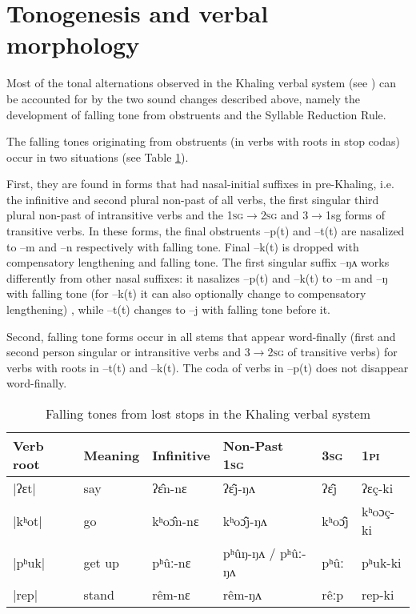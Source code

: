 \documentclass[oldfontcommands,oneside,a4paper,11pt]{article}
\newcommand{\ipa}[1]{{\phon \mbox{#1}}} %
\begin{document}
\section{Tonogenesis and verbal morphology} \label{sec:tonogenesis.verb}
Most of the tonal alternations observed in the Khaling verbal system (see \citealt{jacques12khaling}) can be accounted for by the two sound changes described above, namely the development of falling tone from obstruents and the Syllable Reduction Rule.

 The falling tones originating from obstruents (in verbs with roots in stop codas) occur in two situations (see Table \ref{tab:falling.verb}).
 
 First, they are found  in forms that had nasal-initial suffixes in pre-Khaling, i.e. the infinitive and second plural non-past of all verbs, the first singular third plural non-past of intransitive verbs  and the   \textsc{1sg$\rightarrow$2sg} and {3$\rightarrow$1sg} forms of transitive verbs. In these forms, the final obstruents \ipa{--p(t)} and  \ipa{--t(t)} are nasalized to \ipa{--m} and \ipa{--n} respectively with falling tone. Final \ipa{--k(t)} is dropped with compensatory lengthening and falling tone. The first singular suffix \ipa{--ŋʌ} works differently from other nasal suffixes:  it nasalizes \ipa{--p(t)} and   \ipa{--k(t)} to \ipa{--m} and \ipa{--ŋ} with falling tone (for  \ipa{--k(t)}  it can also optionally change to compensatory lengthening) , while \ipa{--t(t)} changes to \ipa{--j} with falling tone before it.
 
 Second, falling tone forms occur in all stems that appear word-finally (first and second person singular or intransitive verbs and \textsc{3$\rightarrow$2sg} of transitive verbs) for verbs with roots in \ipa{--t(t)} and   \ipa{--k(t)}. The coda of verbs in \ipa{--p(t)} does not disappear word-finally.

\begin{table}[H]
\caption{Falling tones from lost stops in the Khaling verbal system} \centering \label{tab:falling.verb}
\begin{tabular}{llllll}
\toprule
Verb root	&Meaning	&Infinitive  & Non-Past \textsc{1sg} &  \textsc{3sg} &  \textsc{1pi}\\
\midrule
|ʔɛt|	&	say			&\ipa{ʔɛ̂n-nɛ}		&\ipa{ʔɛ̂j-ŋʌ}	&\ipa{ʔɛ̂j} &\ipa{ʔɛç-ki} \\
|kʰot|	&	go		&\ipa{kʰoɔ̂n-nɛ}		&\ipa{kʰoɔ̂j-ŋʌ}&\ipa{kʰoɔ̂j} &\ipa{kʰoɔç-ki} \\
|pʰuk|	&	get up			&\ipa{pʰûː-nɛ}&\ipa{pʰûŋ-ŋʌ} / \ipa{pʰûː-ŋʌ}	&\ipa{pʰûː} &\ipa{pʰuk-ki} \\
|rep|	&	stand		&\ipa{rêm-nɛ}		&\ipa{rêm-ŋʌ}&\ipa{rêːp} &\ipa{rep-ki} \\
\bottomrule
\end{tabular}
\end{table}
\end{document}
